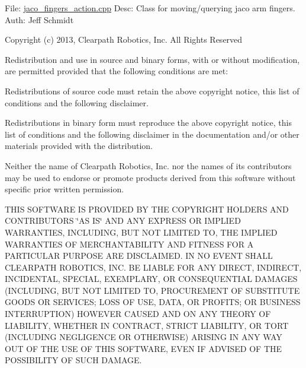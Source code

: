 File\+: \hyperlink{jaco__fingers__action_8cpp}{jaco\+\_\+fingers\+\_\+action.\+cpp} Desc\+: Class for moving/querying jaco arm fingers. Auth\+: Jeff Schmidt

Copyright (c) 2013, Clearpath Robotics, Inc. All Rights Reserved

Redistribution and use in source and binary forms, with or without modification, are permitted provided that the following conditions are met\+:
\begin{DoxyItemize}
\item Redistributions of source code must retain the above copyright notice, this list of conditions and the following disclaimer.
\item Redistributions in binary form must reproduce the above copyright notice, this list of conditions and the following disclaimer in the documentation and/or other materials provided with the distribution.
\item Neither the name of Clearpath Robotics, Inc. nor the names of its contributors may be used to endorse or promote products derived from this software without specific prior written permission.
\end{DoxyItemize}

T\+H\+IS S\+O\+F\+T\+W\+A\+RE IS P\+R\+O\+V\+I\+D\+ED BY T\+HE C\+O\+P\+Y\+R\+I\+G\+HT H\+O\+L\+D\+E\+RS A\+ND C\+O\+N\+T\+R\+I\+B\+U\+T\+O\+RS \char`\"{}\+A\+S I\+S\char`\"{} A\+ND A\+NY E\+X\+P\+R\+E\+SS OR I\+M\+P\+L\+I\+ED W\+A\+R\+R\+A\+N\+T\+I\+ES, I\+N\+C\+L\+U\+D\+I\+NG, B\+UT N\+OT L\+I\+M\+I\+T\+ED TO, T\+HE I\+M\+P\+L\+I\+ED W\+A\+R\+R\+A\+N\+T\+I\+ES OF M\+E\+R\+C\+H\+A\+N\+T\+A\+B\+I\+L\+I\+TY A\+ND F\+I\+T\+N\+E\+SS F\+OR A P\+A\+R\+T\+I\+C\+U\+L\+AR P\+U\+R\+P\+O\+SE A\+RE D\+I\+S\+C\+L\+A\+I\+M\+ED. IN NO E\+V\+E\+NT S\+H\+A\+LL C\+L\+E\+A\+R\+P\+A\+TH R\+O\+B\+O\+T\+I\+CS, I\+NC. BE L\+I\+A\+B\+LE F\+OR A\+NY D\+I\+R\+E\+CT, I\+N\+D\+I\+R\+E\+CT, I\+N\+C\+I\+D\+E\+N\+T\+AL, S\+P\+E\+C\+I\+AL, E\+X\+E\+M\+P\+L\+A\+RY, OR C\+O\+N\+S\+E\+Q\+U\+E\+N\+T\+I\+AL D\+A\+M\+A\+G\+ES (I\+N\+C\+L\+U\+D\+I\+NG, B\+UT N\+OT L\+I\+M\+I\+T\+ED TO, P\+R\+O\+C\+U\+R\+E\+M\+E\+NT OF S\+U\+B\+S\+T\+I\+T\+U\+TE G\+O\+O\+DS OR S\+E\+R\+V\+I\+C\+ES; L\+O\+SS OF U\+SE, D\+A\+TA, OR P\+R\+O\+F\+I\+TS; OR B\+U\+S\+I\+N\+E\+SS I\+N\+T\+E\+R\+R\+U\+P\+T\+I\+ON) H\+O\+W\+E\+V\+ER C\+A\+U\+S\+ED A\+ND ON A\+NY T\+H\+E\+O\+RY OF L\+I\+A\+B\+I\+L\+I\+TY, W\+H\+E\+T\+H\+ER IN C\+O\+N\+T\+R\+A\+CT, S\+T\+R\+I\+CT L\+I\+A\+B\+I\+L\+I\+TY, OR T\+O\+RT (I\+N\+C\+L\+U\+D\+I\+NG N\+E\+G\+L\+I\+G\+E\+N\+CE OR O\+T\+H\+E\+R\+W\+I\+SE) A\+R\+I\+S\+I\+NG IN A\+NY W\+AY O\+UT OF T\+HE U\+SE OF T\+H\+IS S\+O\+F\+T\+W\+A\+RE, E\+V\+EN IF A\+D\+V\+I\+S\+ED OF T\+HE P\+O\+S\+S\+I\+B\+I\+L\+I\+TY OF S\+U\+CH D\+A\+M\+A\+GE.

